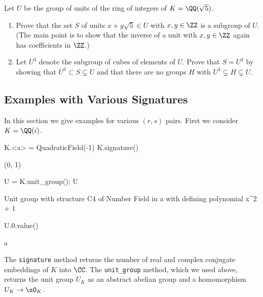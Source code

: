 \begin{exercise}
  Let $U$ be the group of units of the ring of integers
  of $K=\QQ(\sqrt{5})$.
  \begin{enumerate}[label=(\alph*)]
    \item Prove that the set $S$ of units $x+y\sqrt{5} \in U$ with
    $x,y\in\ZZ$ is a subgroup of $U$.  (The main point is to show that
    the inverse of a unit with $x,y\in\ZZ$ again has coefficients in
    $\ZZ$.)
    \item Let $U^3$ denote the subgroup of cubes of elements of $U$.
    Prove that $S=U^3$ by showing that $U^3\subset S \subsetneq U$ and
    that there are no groups $H$ with $U^3\subsetneq H \subsetneq U$.
  \end{enumerate}
\end{exercise}

\subsection{Examples with Various Signatures}

In this section we give examples for various $(r,s)$ pairs.
First we consider $K=\QQ(i)$.
\begin{sagecode}
\begin{sagecell}
K.<a> = QuadraticField(-1)
K.signature()
\end{sagecell}
\begin{sageout}
(0, 1)
\end{sageout}
\begin{sagecell}
U = K.unit_group(); U
\end{sagecell}
\begin{sageout}
Unit group with structure C4 of Number Field in a with
defining polynomial x^2 + 1
\end{sageout}
\begin{sagecell}
U.0.value()
\end{sagecell}
\begin{sageout}
a
\end{sageout}
\end{sagecode}

The {\tt signature} method returns the number of real and complex conjugate
embeddings of $K$ into $\CC$. The {\tt unit\_group} method, which we used above,
returns the unit group $U_K$ as an abstract abelian group and a
homomorphism $U_K\to \sO_K$.

